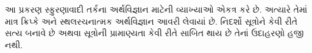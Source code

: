 \documentclass[../../../include/open-logic-chapter]{subfiles}
\begin{document}

\begin{editorial}
  આ પ્રકરણ સ્ફુરણાવાદી તર્કના અર્થવિજ્ઞાન માટેની વ્યાખ્યાઓ
  એકત્ર કરે છે. અત્યારે તેમાં માત્ર ક્રિપ્કે અને સ્થલરચનાત્મક
  અર્થવિજ્ઞાન આવરી લેવાયાં છે. નિદર્શો સૂત્રોને કેવી રીતે સત્ય
  બનાવે છે અથવા સૂત્રોની પ્રામાણ્યતા કેવી રીતે સાબિત થાય છે
  તેનાં ઉદાહરણો હજી નથી.
\end{editorial}


\OLEndChapterHook
\end{document}
